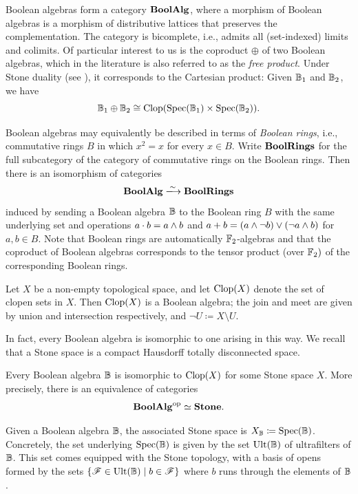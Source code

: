 \documentclass{amsart}
\begin{document}
    \begin{Rem}
        Boolean algebras form a category $\mathbf{BoolAlg}$, where a morphism of Boolean algebras is a morphism of distributive lattices that preserves the complementation.  The category is bicomplete, i.e., admits all (set-indexed) limits and colimits. Of particular interest to us is the coproduct $\oplus$ of two Boolean algebras, which in the literature is also referred to as the \emph{free product}. Under Stone duality (see ), it corresponds to the Cartesian product: Given $\mathbb{B}_1$ and $\mathbb{B}_2$, we have
            \[
                \mathbb{B}_1 \oplus \mathbb{B}_2 \cong \operatorname{Clop}(\operatorname{Spec}(\mathbb{B}_1) \times \operatorname{Spec}(\mathbb{B}_2)).
            \]
    \end{Rem}
    \begin{Rem}\label{rem:booleanrings}
        Boolean algebras may equivalently be described in terms of \emph{Boolean rings}, i.e., commutative rings $B$ in which $x^2=x$ for every $x \in 
        B$. Write $\mathbf{BoolRings}$ for the full subcategory of the category of commutative rings on the Boolean rings. Then there is an isomorphism of categories
            \[
                \BAlg \xlongrightarrow{\sim} \BRings
            \]
        induced by sending a Boolean algebra $\mathbb{B}$ to the Boolean ring $B$ with the same underlying set and operations $a \cdot b = a \land b$ and $a + b = (a \land \neg b) \lor (\neg a \land b)$ for $a,b \in B$. Note that Boolean rings are automatically $\mathbb{F}_2$-algebras and that the coproduct of Boolean algebras corresponds to the tensor product (over $\mathbb{F}_2)$ of the corresponding Boolean rings. 
    \end{Rem}
    \begin{Exa}
        Let $X$ be a non-empty topological space, and let $\operatorname{Clop}(X)$ denote the set of clopen sets in $X$. Then $\operatorname{Clop}(X)$ is a Boolean algebra; the join and meet are given by union and intersection respectively, and $\neg U \coloneqq X \setminus U$. 
    \end{Exa}
    In fact, every Boolean algebra is isomorphic to one arising in this way. We recall that a Stone space is a compact Hausdorff totally disconnected space.
    \begin{Thm}\label{thm:stone-duality}
        Every Boolean algebra $\mathbb{B}$ is isomorphic to $\operatorname{Clop}(X)$ for some Stone space $X$. More precisely, there is an equivalence of categories
        \[
            \mathbf{BoolAlg}^{\mathrm{op}} \simeq \mathbf{Stone}.
        \]
    \end{Thm}
    \begin{Rem}
        Given a Boolean algebra $\mathbb{B}$, the associated Stone space is $X_{\mathbb{B}} \coloneqq \operatorname{Spec}(\mathbb{B})$. Concretely, the set underlying $\operatorname{Spec}(\mathbb{B})$ is given by the set $\operatorname{Ult}(\mathbb{B})$  of ultrafilters of $\mathbb{B}$. This set comes equipped with the Stone topology, with a basis of opens formed by the sets $\{\mathscr{F} \in \operatorname{Ult}(\mathbb{B}) \mid b \in \mathscr{F}\}$ where $b$ runs through the elements of $\mathbb{B}$.
    \end{Rem}
\end{document}

